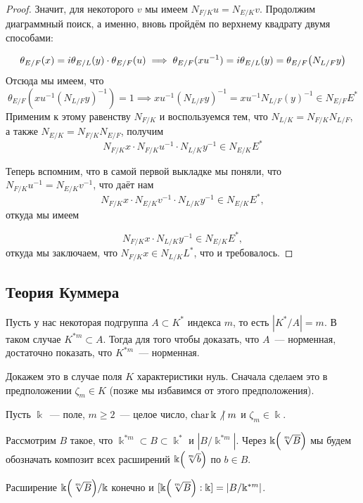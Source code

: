 \begin{proof}
	Значит, для некоторого $v$ мы имеем $N_{F/K}{u} = N_{E/K}{v}$. Продолжим диаграммный поиск, а именно, вновь пройдём по верхнему квадрату двумя способами: 

	\[
		\theta_{E/F}(x) = i \theta_{E/L}(y) \cdot \theta_{E/F}(u) \implies \theta_{E/F}(xu^{-1}) = i\theta_{E/L}(y) = \theta_{E/F}\lr*{N_{L/F}y} 
	\]
	Отсюда мы имеем, что 
	\[
		\theta_{E/F}(x u^{-1} (N_{L/F}y)^{-1}) = 1 \implies x u^{-1} (N_{L/F}y)^{-1}  = x u^{-1} N_{L/F}(y)^{-1} \in N_{E/F} E^*
	\]
	Применим к этому равенству $N_{F/K}$ и воспользуемся тем, что $N_{L/K} = N_{F/K} N_{L/F}$, а также $N_{E/K} = N_{F/K} N_{E/F}$, получим 
	\[
		N_{F/K}{x} \cdot N_{F/K}{u^{-1}} \cdot N_{L/K}{y^{-1}} \in N_{E/K}E^*
	\]

	Теперь вспомним, что в самой первой выкладке мы поняли, что $N_{F/K}{u^{-1}} = N_{E/K}{v^{-1}}$, что даёт нам 
	\[
				N_{F/K}{x} \cdot N_{E/K}{v^{-1}} \cdot N_{L/K}{y^{-1}} \in N_{E/K}E^*, 
	\]
	откуда мы имеем 

	\[
		N_{F/K}{x} \cdot N_{L/K}{y^{-1}} \in N_{E/K}E^*, 
	\]
	откуда мы заключаем, что $N_{F/K}{x} \in N_{L/K}L^*$, что и требовалось. 
	

	\end{proof}

    \subsection{Теория Куммера}

	Пусть у нас некоторая подгруппа $A \subset K^*$ индекса $m$, то есть $|K^*/A| = m$. В таком случае $K^{* m} \subset A$. Тогда для того чтобы доказать, что $A$~--- норменная, достаточно показать, что $K^{* m}$~--- норменная. 

	Докажем это в случае поля $K$ характеристики нуль. Сначала сделаем это в предположении $\zeta_m \in K$ (позже мы избавимся от этого предположения). 


	Пусть $\Bbbk$~--- поле, $m \ge 2$~--- целое число, $\operatorname{char}{\Bbbk} \not \ \mid m$ и $\zeta_m \in \Bbbk$. 

	Рассмотрим $B$ такое, что $\Bbbk^{* m} \subset B \subset \Bbbk^{*}$ и $|B/\Bbbk^{* m}|$. Через $\Bbbk\lr*{\sqrt[m]{B}}$ мы будем обозначать композит всех расширений $\Bbbk\lr*{\sqrt[m]{b}}$ по $b \in B$. 

	\begin{theorem}[Куммер] 
		Расширение $\Bbbk\lr*{\sqrt[m]{B}}/\Bbbk$ конечно и $[\Bbbk\lr*{\sqrt[m]{B}} : \Bbbk] = |B/\Bbbk^{* m}|$. 
	\end{theorem}

